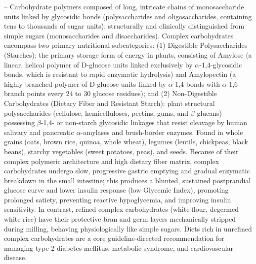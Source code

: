 -- Carbohydrate polymers composed of long, intricate chains of monosaccharide units linked by glycosidic bonds (polysaccharides and oligosaccharides, containing tens to thousands of sugar units), structurally and clinically distinguished from simple sugars (monosaccharides and disaccharides). Complex carbohydrates encompass two primary nutritional subcategories: (1) Digestible Polysaccharides (Starches): the primary storage form of energy in plants, consisting of Amylose (a linear, helical polymer of D-glucose units linked exclusively by $\alpha$-1,4-glycosidic bonds, which is resistant to rapid enzymatic hydrolysis) and Amylopectin (a highly branched polymer of D-glucose units linked by $\alpha$-1,4 bonds with $\alpha$-1,6 branch points every 24 to 30 glucose residues); and (2) Non-Digestible Carbohydrates (Dietary Fiber and Resistant Starch): plant structural polysaccharides (cellulose, hemicelluloses, pectins, gums, and $\beta$-glucans) possessing $\beta$-1,4- or non-starch glycosidic linkages that resist cleavage by human salivary and pancreatic $\alpha$-amylases and brush-border enzymes. Found in whole grains (oats, brown rice, quinoa, whole wheat), legumes (lentils, chickpeas, black beans), starchy vegetables (sweet potatoes, peas), and seeds. Because of their complex polymeric architecture and high dietary fiber matrix, complex carbohydrates undergo slow, progressive gastric emptying and gradual enzymatic breakdown in the small intestine; this produces a blunted, sustained postprandial glucose curve and lower insulin response (low Glycemic Index), promoting prolonged satiety, preventing reactive hypoglycemia, and improving insulin sensitivity. In contrast, refined complex carbohydrates (white flour, degermed white rice) have their protective bran and germ layers mechanically stripped during milling, behaving physiologically like simple sugars. Diets rich in unrefined complex carbohydrates are a core guideline-directed recommendation for managing type 2 diabetes mellitus, metabolic syndrome, and cardiovascular disease.

